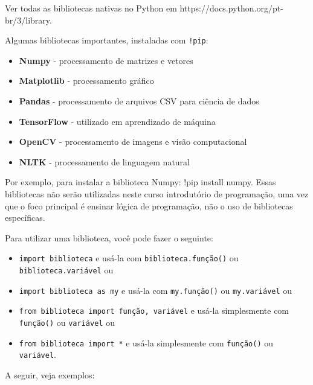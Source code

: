 \documentclass[12pt,a4paper]{article}
\providecommand{\tightlist}{%
      \setlength{\itemsep}{0pt}\setlength{\parskip}{0pt}}
\begin{document}
    Ver todas as bibliotecas nativas no Python em
https://docs.python.org/pt-br/3/library.

Algumas bibliotecas importantes, instaladas com \texttt{!pip}:

\begin{itemize}
\tightlist
\item
  \textbf{Numpy} - processamento de matrizes e vetores
\item
  \textbf{Matplotlib} - processamento gráfico
\item
  \textbf{Pandas} - processamento de arquivos CSV para ciência de dados
\item
  \textbf{TensorFlow} - utilizado em aprendizado de máquina
\item
  \textbf{OpenCV} - processamento de imagens e visão computacional
\item
  \textbf{NLTK} - processamento de linguagem natural
\end{itemize}

Por exemplo, para instalar a biblioteca Numpy: !pip install numpy. Essas
bibliotecas não serão utilizadas neste curso introdutório de
programação, uma vez que o foco principal é ensinar lógica de
programação, não o uso de bibliotecas específicas.

    Para utilizar uma biblioteca, você pode fazer o seguinte:

\begin{itemize}
\tightlist
\item
  \texttt{import\ biblioteca} e usá-la com \texttt{biblioteca.função()}
  ou \texttt{biblioteca.variável} ou
\item
  \texttt{import\ biblioteca\ as\ my} e usá-la com \texttt{my.função()}
  ou \texttt{my.variável} ou\\
\item
  \texttt{from\ biblioteca\ import\ função,\ variável} e usá-la
  simplesmente com \texttt{função()} ou \texttt{variável} ou
\item
  \texttt{from\ biblioteca\ import\ *} e usá-la simplesmente com
  \texttt{função()} ou \texttt{variável}.
\end{itemize}

A seguir, veja exemplos:
\end{document}
